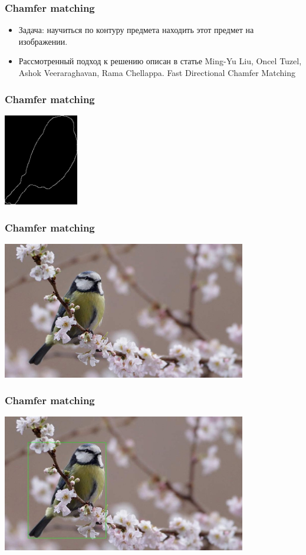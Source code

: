 \begin{frame}\frametitle{Chamfer matching}
    \begin{itemize}
        \item Задача: научиться по контуру предмета находить этот предмет на изображении.
        \pause
        \item Рассмотренный подход к решению описан в статье
        Ming-Yu Liu, Oncel Tuzel, Ashok Veeraraghavan, Rama Chellappa. Fast Directional Chamfer Matching
    \end{itemize}
\end{frame}

\begin{frame}\frametitle{Chamfer matching}
    \begin{center}
        \includegraphics[height=4cm]{veselov_imgs/pattern3.jpg}
    \end{center}
\end{frame}

\begin{frame}\frametitle{Chamfer matching}
    \begin{center}
        \includegraphics[height=6cm]{veselov_imgs/image3.jpg}
    \end{center}
\end{frame}

\begin{frame}\frametitle{Chamfer matching}
    \begin{center}
        \includegraphics[height=6cm]{veselov_imgs/occurrence3.jpg}
    \end{center}
\end{frame}

